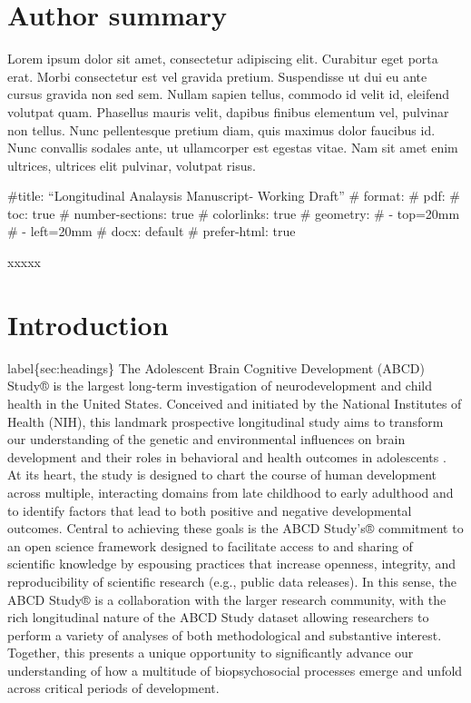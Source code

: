 \documentclass[
  10pt,
  letterpaper,
]{article}
\begin{document}
\section*{Author summary}
Lorem ipsum dolor sit amet, consectetur adipiscing elit. Curabitur eget
porta erat. Morbi consectetur est vel gravida pretium. Suspendisse ut
dui eu ante cursus gravida non sed sem. Nullam sapien tellus, commodo id
velit id, eleifend volutpat quam. Phasellus mauris velit, dapibus
finibus elementum vel, pulvinar non tellus. Nunc pellentesque pretium
diam, quis maximus dolor faucibus id. Nunc convallis sodales ante, ut
ullamcorper est egestas vitae. Nam sit amet enim ultrices, ultrices elit
pulvinar, volutpat risus.

\linenumbersxxxxx

\#title: ``Longitudinal Analaysis Manuscript- Working Draft'' \# format:
\# pdf: \# toc: true \# number-sections: true \# colorlinks: true \#
geometry: \# - top=20mm \# - left=20mm \# docx: default \# prefer-html:
true

xxxxx

\hypertarget{introduction}{%
\section{Introduction}\label{introduction}}

label\{sec:headings\} The Adolescent Brain Cognitive Development (ABCD)
Study® is the largest long-term investigation of neurodevelopment and
child health in the United States. Conceived and initiated by the
National Institutes of Health (NIH), this landmark prospective
longitudinal study aims to transform our understanding of the genetic
and environmental influences on brain development and their roles in
behavioral and health outcomes in adolescents \citep{volkow2018}. At its
heart, the study is designed to chart the course of human development
across multiple, interacting domains from late childhood to early
adulthood and to identify factors that lead to both positive and
negative developmental outcomes. Central to achieving these goals is the
ABCD Study's® commitment to an open science framework designed to
facilitate access to and sharing of scientific knowledge by espousing
practices that increase openness, integrity, and reproducibility of
scientific research (e.g., public data releases). In this sense, the
ABCD Study® is a collaboration with the larger research community, with
the rich longitudinal nature of the ABCD Study dataset allowing
researchers to perform a variety of analyses of both methodological and
substantive interest. Together, this presents a unique opportunity to
significantly advance our understanding of how a multitude of
biopsychosocial processes emerge and unfold across critical periods of
development.
\end{document}
